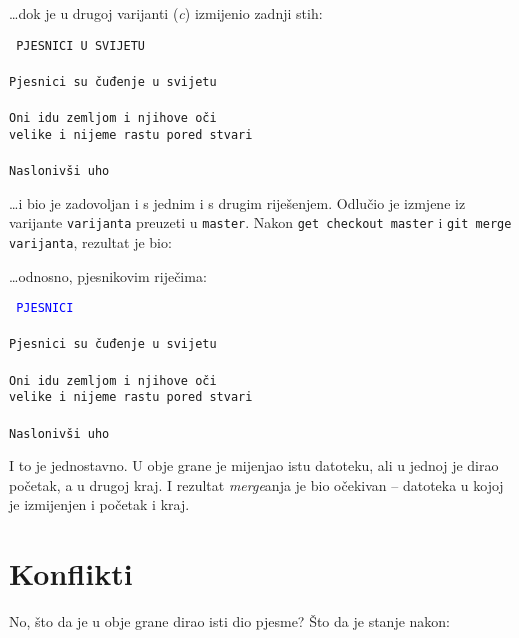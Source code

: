 \dots{}dok je u drugoj varijanti (\emph c) izmijenio zadnji stih:

\vspace{5mm}
\noindent\texttt{%
PJESNICI U SVIJETU\\%
\\%
Pjesnici su čuđenje u svijetu\\%
\\%
Oni idu zemljom i njihove oči\\%
velike i nijeme rastu pored stvari\\%
\\%
Naslonivši uho\\%
\color{blue}{na ćutanje sto ih okružuje i muči\\%
pjesnici su vječno treptanje u svijetu}}
\vspace{5mm}

\dots{}i bio je zadovoljan i s jednim i s drugim riješenjem.
Odlučio je izmjene iz varijante \verb+varijanta+ preuzeti u \verb+master+.
Nakon \verb+get checkout master+ i \verb+git merge varijanta+, rezultat je bio:



\dots{}odnosno, pjesnikovim riječima:

\vspace{5mm}
\noindent\texttt{%
\textcolor{blue}{PJESNICI}\\%
\\%
Pjesnici su čuđenje u svijetu\\%
\\%
Oni idu zemljom i njihove oči\\%
velike i nijeme rastu pored stvari\\%
\\%
Naslonivši uho\\%
\color{blue}{na ćutanje sto ih okružuje i muči\\%
pjesnici su vječno treptanje u svijetu}}
\vspace{5mm}

I to je jednostavno.
U obje grane je mijenjao istu datoteku, ali u jednoj je dirao početak, a u drugoj kraj.
I rezultat \emph{merge}anja je bio očekivan -- datoteka u kojoj je izmijenjen i početak i kraj.

\section*{Konflikti}

No, što da je u obje grane dirao isti dio pjesme?
Što da je stanje nakon:

